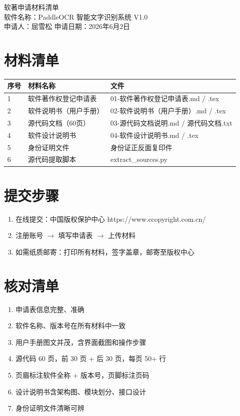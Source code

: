 \documentclass[12pt,a4paper]{ctexart}
\begin{document}
\begin{center}
{\heiti{} 软著申请材料清单}\\[0.5cm]
{ 软件名称：PaddleOCR 智能文字识别系统 V1.0}\\
{ 申请人：屈雪松 \quad 申请日期：2026年6月2日}\\[1cm]
\end{center}

\section*{材料清单}

\begin{longtable}{|p{1cm}|p{6cm}|p{6cm}|}
\hline
\textbf{序号} & \textbf{材料名称} & \textbf{文件} \\\hline
1 & 软件著作权登记申请表 & 01-软件著作权登记申请表.md / .tex \\\hline
2 & 软件说明书（用户手册） & 02-软件说明书（用户手册）.md / .tex \\\hline
3 & 源代码文档（60页） & 03-源代码文档说明.md / 源代码文档.txt \\\hline
4 & 软件设计说明书 & 04-软件设计说明书.md / .tex \\\hline
5 & 身份证明文件 & 身份证正反面复印件 \\\hline
6 & 源代码提取脚本 & extract\_sources.py \\\hline
\end{longtable}

\section*{提交步骤}

\begin{enumerate}
    \item 在线提交：中国版权保护中心 https://www.ccopyright.com.cn/
    \item 注册账号 $\rightarrow$ 填写申请表 $\rightarrow$ 上传材料
    \item 如需纸质邮寄：打印所有材料，签字盖章，邮寄至版权中心
\end{enumerate}

\section*{核对清单}

\begin{enumerate}
    \item[\checkedbox] 申请表信息完整、准确
    \item[\checkedbox] 软件名称、版本号在所有材料中一致
    \item[\checkedbox] 用户手册图文并茂，含界面截图和操作步骤
    \item[\checkedbox] 源代码 60 页，前 30 页 + 后 30 页，每页 50+ 行
    \item[\checkedbox] 页眉标注软件全称 + 版本号，页脚标注页码
    \item[\checkedbox] 设计说明书含架构图、模块划分、接口设计
    \item[\checkedbox] 身份证明文件清晰可辨
\end{enumerate}
\end{document}
